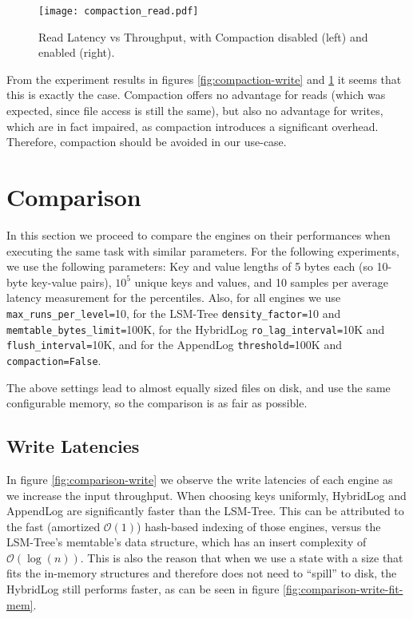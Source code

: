 \begin{figure}[h]
    \centering
    \texttt{[image: compaction\_read.pdf]}
    \caption{Read Latency vs Throughput, with Compaction disabled (left) and enabled (right).}
    \label{fig:compaction_read}
\end{figure}

From the experiment results in figures \ref{fig:compaction-write} and \ref{fig:compaction_read} it seems that this is exactly the case. Compaction offers no advantage for reads (which was expected, since file access is still the same), but also no advantage for writes, which are in fact impaired, as compaction introduces a significant overhead. Therefore, compaction should be avoided in our use-case.

\section{Comparison}

In this section we proceed to compare the engines on their performances when executing the same task with similar parameters. For the following experiments, we use the following parameters: Key and value lengths of 5 bytes each (so 10-byte key-value pairs), $10^5$ unique keys and values, and 10 samples per average latency measurement for the percentiles. Also, for all engines we use \verb"max_runs_per_level="10, for the LSM-Tree \verb"density_factor="10 and \verb"memtable_bytes_limit="100K, for the HybridLog \verb"ro_lag_interval="10K and \verb"flush_interval="10K, and for the AppendLog \verb"threshold="100K and \verb|compaction=False|.

The above settings lead to almost equally sized files on disk, and use the same configurable memory, so the comparison is as fair as possible.

\subsection{Write Latencies}

In figure \ref{fig:comparison-write} we observe the write latencies of each engine as we increase the input throughput. When choosing keys uniformly, HybridLog and AppendLog are significantly faster than the LSM-Tree. This can be attributed to the fast (amortized $\mathcal{O}(1)$) hash-based indexing of those engines, versus the LSM-Tree's memtable's data structure, which has an insert complexity of $\mathcal{O}(\log{}(n))$. This is also the reason that when we use a state with a size that fits the in-memory structures and therefore does not need to ``spill'' to disk, the HybridLog still performs faster, as can be seen in figure \ref{fig:comparison-write-fit-mem}.


